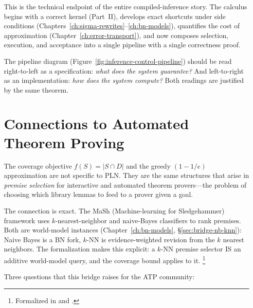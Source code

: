 \documentclass[11pt,openany]{report}
\begin{document}
\noindent
This is the technical endpoint of the entire compiled-inference story.
The calculus begins with a correct kernel (Part~II), develops exact
shortcuts under side conditions (Chapters~\ref{ch:sigma-rewrites}--\ref{ch:bn-models}), quantifies the cost of approximation
(Chapter~\ref{ch:error-transport}), and now composes
selection, execution, and acceptance into a single
pipeline with a single correctness proof.

The pipeline diagram (Figure~\ref{fig:inference-control-pipeline})
should be read right-to-left as a specification:
\emph{what does the system guarantee?}  And left-to-right as an
implementation: \emph{how does the system compute?}  Both readings
are justified by the same theorem.


\section{Connections to Automated Theorem Proving}

The coverage objective $f(S) = |S \cap D|$ and the greedy
$(1 - 1/e)$ approximation are not specific to PLN.  They are the
same structures that arise in \emph{premise selection} for
interactive and automated theorem provers---the problem of choosing
which library lemmas to feed to a prover given a goal.

The connection is exact.  The MaSh (Machine-learning for Sledgehammer)
framework uses $k$-nearest-neighbor and naive-Bayes classifiers to
rank premises.  Both are world-model instances
(Chapter~\ref{ch:bn-models}, \S\ref{sec:bridge-nb-knn}): Naive Bayes
is a BN fork, $k$-NN is evidence-weighted revision from the $k$
nearest neighbors.  The formalization makes this explicit: a
$k$-NN premise selector IS an additive world-model query, and the
coverage bound applies to it.%
\footnote{Formalized in
 and
.}

Three questions that this bridge raises for the ATP community:
\end{document}
